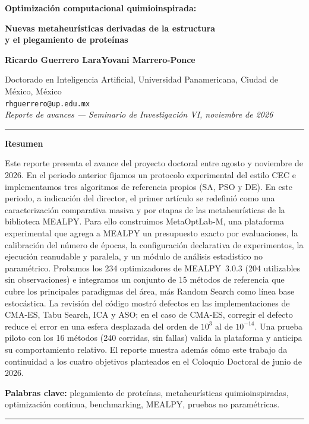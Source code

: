 \documentclass[11pt,letterpaper]{article}
\begin{document}
\begin{center}
{\LARGE\bfseries Optimización computacional quimioinspirada:\par}
\vspace{4pt}
{\large\bfseries Nuevas metaheurísticas derivadas de la estructura\\ y el plegamiento de proteínas\par}
\vspace{14pt}
{\large\bfseries Ricardo Guerrero Lara\qquad Yovani Marrero-Ponce\par}
\vspace{6pt}
Doctorado en Inteligencia Artificial, Universidad Panamericana, Ciudad de México, México\\[6pt]
\texttt{rhguerrero@up.edu.mx}\\[8pt]
\textit{Reporte de avances --- Seminario de Investigación VI, noviembre de 2026}
\end{center}
\vspace{2pt}
\noindent\rule{\textwidth}{0.4pt}

\begin{center}
\begin{minipage}{0.86\textwidth}
{\centering\textbf{Resumen}\par}\vspace{4pt}
\small
Este reporte presenta el avance del proyecto doctoral entre agosto y noviembre de 2026. En el periodo anterior fijamos un protocolo experimental del estilo CEC e implementamos tres algoritmos de referencia propios (SA, PSO y DE). En este periodo, a indicación del director, el primer artículo se redefinió como una caracterización comparativa masiva y por etapas de las metaheurísticas de la biblioteca MEALPY. Para ello construimos MetaOptLab-M, una plataforma experimental que agrega a MEALPY un presupuesto exacto por evaluaciones, la calibración del número de épocas, la configuración declarativa de experimentos, la ejecución reanudable y paralela, y un módulo de análisis estadístico no paramétrico. Probamos los 234 optimizadores de MEALPY~3.0.3 (204 utilizables sin observaciones) e integramos un conjunto de 15 métodos de referencia que cubre los principales paradigmas del área, más Random Search como línea base estocástica. La revisión del código mostró defectos en las implementaciones de CMA-ES, Tabu Search, ICA y ASO; en el caso de CMA-ES, corregir el defecto reduce el error en una esfera desplazada del orden de $10^{3}$ al de $10^{-14}$. Una prueba piloto con los 16 métodos (240 corridas, sin fallas) valida la plataforma y anticipa su comportamiento relativo. El reporte muestra además cómo este trabajo da continuidad a los cuatro objetivos planteados en el Coloquio Doctoral de junio de 2026.

\vspace{6pt}
\noindent\textbf{Palabras clave:} plegamiento de proteínas, metaheurísticas quimioinspiradas, optimización continua, benchmarking, MEALPY, pruebas no paramétricas.
\end{minipage}
\end{center}
\noindent\rule{\textwidth}{0.4pt}
\end{document}
